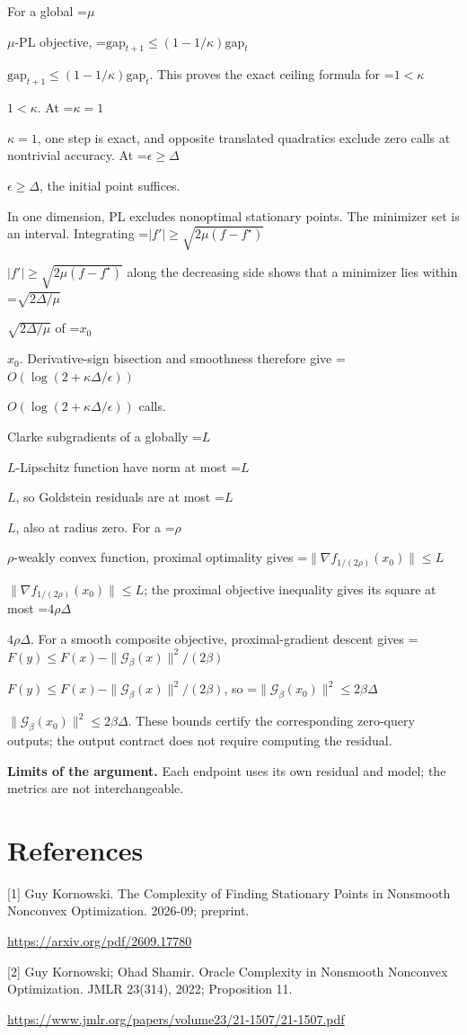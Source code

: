 \documentclass[10pt,a4paper]{article}
\newcommand{\AtlasMath}[1]{\par\begingroup\centering\setbox0=\hbox{$\displaystyle #1$}\ifdim\wd0>1.4\linewidth\typeout{ATLAS WIDE FORMULA: \the\wd0}\fi\ifdim\wd0>\linewidth\resizebox{\linewidth}{!}{\box0}\else\box0\fi\par\endgroup}
\newcommand{\AtlasInlineMath}[1]{\begingroup\setbox0=\hbox{$#1$}\ifdim\wd0>.4\linewidth\endgroup\AtlasMath{#1}\else\endgroup$#1$\fi}
\begin{document}
For a global \AtlasInlineMath{\mu}-PL objective,
\AtlasInlineMath{\mathrm{gap}_{t+1}\le(1-1/\kappa)\mathrm{gap}_t}.
This proves the exact ceiling formula for \AtlasInlineMath{1<\kappa}. At \AtlasInlineMath{\kappa=1}, one step is exact, and opposite translated quadratics exclude zero calls at nontrivial accuracy. At \AtlasInlineMath{\epsilon\ge\Delta}, the initial point suffices.

In one dimension, PL excludes nonoptimal stationary points. The minimizer set is an interval. Integrating
\AtlasInlineMath{|f'|\ge\sqrt{2\mu(f-f^\star)}}
along the decreasing side shows that a minimizer lies within \AtlasInlineMath{\sqrt{2\Delta/\mu}} of \AtlasInlineMath{x_0}. Derivative-sign bisection and smoothness therefore give \AtlasInlineMath{O(\log(2+\kappa\Delta/\epsilon))} calls.

Clarke subgradients of a globally \AtlasInlineMath{L}-Lipschitz function have norm at most \AtlasInlineMath{L}, so Goldstein residuals are at most \AtlasInlineMath{L}, also at radius zero. For a \AtlasInlineMath{\rho}-weakly convex function, proximal optimality gives
\AtlasInlineMath{\|\nabla f_{1/(2\rho)}(x_0)\|\le L}; the proximal objective inequality gives its square at most \AtlasInlineMath{4\rho\Delta}.
For a smooth composite objective, proximal-gradient descent gives
\AtlasInlineMath{F(y)\le F(x)-\|\mathcal G_\beta(x)\|^2/(2\beta)},
so \AtlasInlineMath{\|\mathcal G_\beta(x_0)\|^2\le2\beta\Delta}.
These bounds certify the corresponding zero-query outputs; the output contract does not require computing the residual.

\textbf{Limits of the argument.} Each endpoint uses its own residual and model; the metrics are not interchangeable.

\section{References}
[1] Guy Kornowski. The Complexity of Finding Stationary Points in Nonsmooth Nonconvex Optimization. 2026-09; preprint.

\url{https://arxiv.org/pdf/2609.17780}

[2] Guy Kornowski; Ohad Shamir. Oracle Complexity in Nonsmooth Nonconvex Optimization. JMLR 23(314), 2022; Proposition 11.

\url{https://www.jmlr.org/papers/volume23/21-1507/21-1507.pdf}
\end{document}

